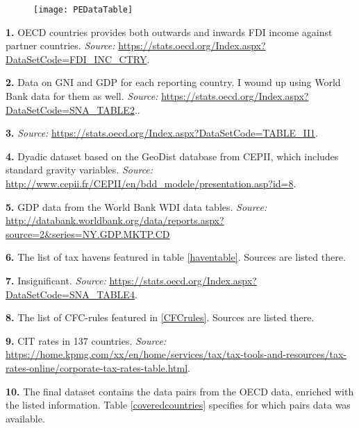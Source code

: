 \documentclass[twoside,a4paper,11pt]{article}
\begin{document}
\begin{figure}[ht!]
	\centering
	\label{dataprocess}
	\texttt{[image: PEDataTable]}
\end{figure}
\noindent \textbf{1.} OECD countries provides both outwards and inwards FDI income against partner countries. \textit{Source:}  \url{https://stats.oecd.org/Index.aspx?DataSetCode=FDI_INC_CTRY}. 

\noindent \textbf{2.} Data on GNI and GDP for each reporting country. I wound up using World Bank data for them as well. \textit{Source:} \url{https://stats.oecd.org/Index.aspx?DataSetCode=SNA_TABLE2}..

\noindent \textbf{3.} \textit{Source:} \url{https://stats.oecd.org/Index.aspx?DataSetCode=TABLE_II1}.

\noindent \textbf{4.} Dyadic dataset based on the GeoDist database from CEPII, which includes standard gravity variables. \textit{Source:} \url{http://www.cepii.fr/CEPII/en/bdd_modele/presentation.asp?id=8}.

\noindent \textbf{5.} GDP data from the World Bank WDI data tables. \textit{Source:} \url{http://databank.worldbank.org/data/reports.aspx?source=2&series=NY.GDP.MKTP.CD}

\noindent \textbf{6.} The list of tax havens featured in table \ref{haventable}. Sources are listed there.
 
\noindent \textbf{7.} Insignificant. \textit{Source:} \url{https://stats.oecd.org/Index.aspx?DataSetCode=SNA_TABLE4}.

\noindent \textbf{8.} The list of CFC-rules featured in \ref{CFCrules}. Sources are listed there. 

\noindent \textbf{9.} CIT rates in 137 countries. \textit{Source:} \url{https://home.kpmg.com/xx/en/home/services/tax/tax-tools-and-resources/tax-rates-online/corporate-tax-rates-table.html}. 

\noindent \textbf{10.} The final dataset contains the data pairs from the OECD data, enriched with the listed information. Table \ref{coveredcountries} specifies for which pairs data was available.
\end{document}
